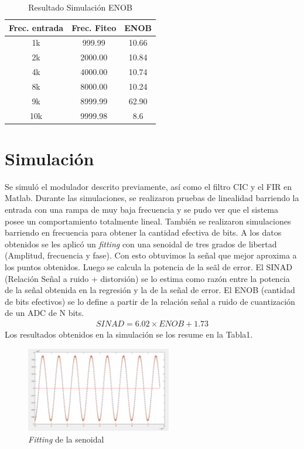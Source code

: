 \documentclass[a4paper,conference]{IEEEtran}
\begin{document}
\begin{table}[!b]
\renewcommand{\arraystretch}{1.3}
\caption{Resultado Simulaci\'on ENOB}
\label{Tabla_1}
\centering
\begin{tabular}{|c|c|c|}
\hline
Frec. entrada & Frec. Fiteo & ENOB\\
\hline
1k & 999.99 & 10.66\\
\hline
2k & 2000.00 & 10.84\\
\hline
4k & 4000.00 & 10.74\\
\hline
8k & 8000.00 & 10.24\\
\hline
9k & 8999.99 & 62.90\\
\hline
10k & 9999.98 & 8.6\\
\hline
\end{tabular}
\end{table}

\section{Simulaci\'on}
Se simul\'o el modulador descrito previamente, as\'i como el filtro CIC y el FIR en Matlab.
Durante las simulaciones, se realizaron pruebas de linealidad barriendo la entrada con una rampa de muy baja frecuencia y se pudo ver que el sistema posee un comportamiento totalmente lineal.
Tambi\'en se realizaron simulaciones barriendo en frecuencia para obtener la cantidad efectiva de bits.
A los datos obtenidos se les aplic\'o un \textit{fitting} con una senoidal de tres grados de libertad (Amplitud, frecuencia y fase). Con esto obtuvimos la se\~nal que mejor aproxima a los puntos obtenidos. Luego se calcula la potencia de la se\~al de error. El SINAD (Relaci\'on Se\~nal a ruido + distorsi\'on) se lo estima como raz\'on entre la potencia de la se\~nal obtenida en la regresi\'on y la de la señal de error. El ENOB (cantidad de bits efectivos) se lo define a partir de la relaci\'on se\~nal a ruido de cuantizaci\'on de un ADC de N bits.
\begin{align}
SINAD=6.02 \times ENOB + 1.73
\end{align}
Los resultados obtenidos en la simulaci\'on se los resume en la Tabla1.

\begin{figure}[!t]
\centering
\includegraphics[width=2.5in]{Simulacion_fiteo}
\caption{\textit{Fitting} de la senoidal}
\label{fig_11}
\end{figure}
\end{document}
